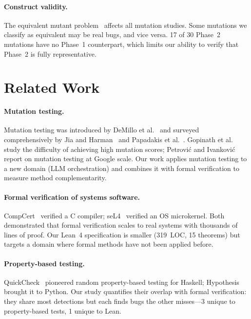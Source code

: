 \documentclass[11pt,a4paper]{article}
\begin{document}
\paragraph{Construct validity.}
The equivalent mutant problem~\cite{papadakis2019mutation} affects
all mutation studies. Some mutations we classify as equivalent may be
real bugs, and vice versa. 17 of 30 Phase~2 mutations have no
Phase~1 counterpart, which limits our ability to verify that Phase~2
is fully representative.

\section{Related Work}
\label{sec:related}

\paragraph{Mutation testing.}
Mutation testing was introduced by DeMillo et
al.~\cite{demillo1978hints} and surveyed comprehensively by Jia and
Harman~\cite{jia2011analysis} and Papadakis et
al.~\cite{papadakis2019mutation}. Gopinath et
al.~\cite{gopinath2014mutations} study the difficulty of achieving
high mutation scores; Petrovi\'c and
Ivankovi\'c~\cite{petrovic2018state} report on mutation testing at
Google scale. Our work applies mutation testing to a new domain
(LLM orchestration) and combines it with formal verification to
measure method complementarity.

\paragraph{Formal verification of systems software.}
CompCert~\cite{leroy2009compcert} verified a C compiler;
seL4~\cite{klein2009sel4} verified an OS microkernel. Both
demonstrated that formal verification scales to real systems
with thousands of lines of proof. Our Lean~4 specification is
smaller (319~LOC, 15 theorems) but targets a domain where formal
methods have not been applied before.

\paragraph{Property-based testing.}
\begin{sloppypar}
QuickCheck~\cite{claessen2000quickcheck} pioneered random property-based
testing for Haskell; Hypothesis~\cite{hypothesis2024} brought it to
Python. Our study quantifies their overlap with formal verification:
they share most detections but each finds bugs the other misses---3
unique to property-based tests, 1 unique to Lean.
\end{sloppypar}
\end{document}
